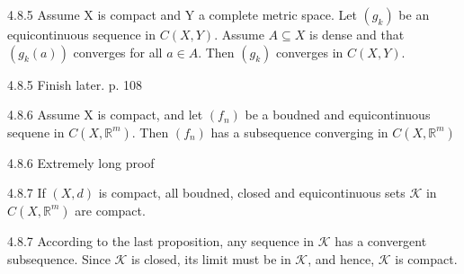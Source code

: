 \documentclass[a4paper,norsk]{article}
\begin{document}
\begin{lemmabox}{4.8.5}{}
Assume X is compact and Y a complete metric space. Let $ \left( g_k \right)  $ be an equicontinuous sequence in $ C \left( X, Y \right)  $. Assume $ A \subseteq X $ is dense and that $ \left( g_k(a) \right)  $ converges for all $ a \in A $. Then $ \left( g_k \right)  $ converges in $ C \left( X, Y \right)  $.

\begin{proofbox}{4.8.5}{}
  Finish later. p. 108
\end{proofbox}
\end{lemmabox}


\begin{propositionbox}{4.8.6}{}
Assume X is compact, and let $ \left( f_n \right)  $ be a boudned and equicontinuous sequene in $ C \left( X, \mathbb{R}^m \right) $. Then $ \left( f_n \right)  $  has a subsequence converging in $ C \left( X, \mathbb{R}^m \right)  $ 

\begin{proofbox}{4.8.6}{}
  Extremely long proof
\end{proofbox}
\end{propositionbox}


\begin{corollarybox}{4.8.7}{}
If $ \left( X, d \right)  $ is compact, all boudned, closed and equicontinuous sets $ \mathcal{K} $ in $ C \left( X, \mathbb{R}^m \right)  $ are compact.

\begin{proofbox}{4.8.7  }{}
  According to the last proposition, any sequence in $ \mathcal{K} $ has a convergent subsequence. Since $ \mathcal{K} $ is closed, its limit must be in $ \mathcal{K} $, and hence, $ \mathcal{K} $ is compact.
\end{proofbox}
\end{corollarybox}
\end{document}
